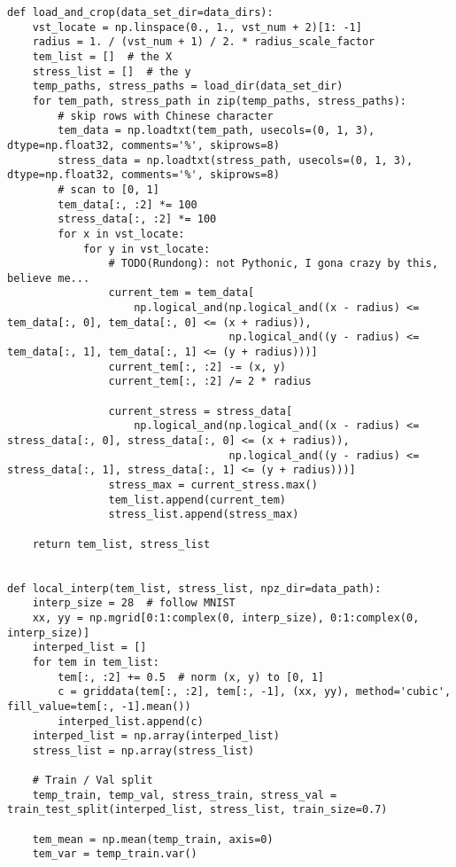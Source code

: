 \begin{verbatim}
def load_and_crop(data_set_dir=data_dirs):
    vst_locate = np.linspace(0., 1., vst_num + 2)[1: -1]
    radius = 1. / (vst_num + 1) / 2. * radius_scale_factor
    tem_list = []  # the X
    stress_list = []  # the y
    temp_paths, stress_paths = load_dir(data_set_dir)
    for tem_path, stress_path in zip(temp_paths, stress_paths):
        # skip rows with Chinese character
        tem_data = np.loadtxt(tem_path, usecols=(0, 1, 3), dtype=np.float32, comments='%', skiprows=8)
        stress_data = np.loadtxt(stress_path, usecols=(0, 1, 3), dtype=np.float32, comments='%', skiprows=8)
        # scan to [0, 1]
        tem_data[:, :2] *= 100
        stress_data[:, :2] *= 100
        for x in vst_locate:
            for y in vst_locate:
                # TODO(Rundong): not Pythonic, I gona crazy by this, believe me...
                current_tem = tem_data[
                    np.logical_and(np.logical_and((x - radius) <= tem_data[:, 0], tem_data[:, 0] <= (x + radius)),
                                   np.logical_and((y - radius) <= tem_data[:, 1], tem_data[:, 1] <= (y + radius)))]
                current_tem[:, :2] -= (x, y)
                current_tem[:, :2] /= 2 * radius

                current_stress = stress_data[
                    np.logical_and(np.logical_and((x - radius) <= stress_data[:, 0], stress_data[:, 0] <= (x + radius)),
                                   np.logical_and((y - radius) <= stress_data[:, 1], stress_data[:, 1] <= (y + radius)))]
                stress_max = current_stress.max()
                tem_list.append(current_tem)
                stress_list.append(stress_max)

    return tem_list, stress_list


def local_interp(tem_list, stress_list, npz_dir=data_path):
    interp_size = 28  # follow MNIST
    xx, yy = np.mgrid[0:1:complex(0, interp_size), 0:1:complex(0, interp_size)]
    interped_list = []
    for tem in tem_list:
        tem[:, :2] += 0.5  # norm (x, y) to [0, 1]
        c = griddata(tem[:, :2], tem[:, -1], (xx, yy), method='cubic', fill_value=tem[:, -1].mean())
        interped_list.append(c)
    interped_list = np.array(interped_list)
    stress_list = np.array(stress_list)

    # Train / Val split
    temp_train, temp_val, stress_train, stress_val = train_test_split(interped_list, stress_list, train_size=0.7)

    tem_mean = np.mean(temp_train, axis=0)
    tem_var = temp_train.var()


\end{verbatim}
